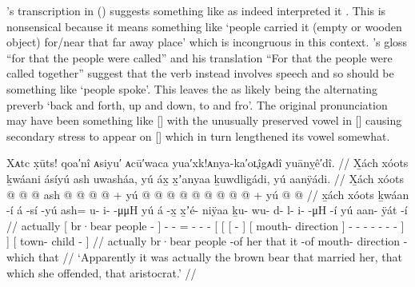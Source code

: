 \citeauthor{swanton:1909}’s transcription  in (\lastx) suggests something like  as indeed \citeauthor{leer:1977} interpreted it \parencite[2]{leer:1977}.
This is nonsensical because it means something like ‘people carried it (empty or wooden object) for/near that far away place’ which is incongruous in this context.
\citeauthor{swanton:1909}’s gloss “for that the people were called” and his translation “For that the people were called together” suggest that the verb instead involves speech and so should be something like  ‘people spoke’.
This leaves the  as likely being the alternating preverb  ‘back and forth, up and down, to and fro’.
The original pronunciation may have been something like [] with the unusually preserved vowel in [] causing secondary stress to appear on [] which in turn lengthened its vowel somewhat. 

\ex\label{ex:89-21-actually-brown-bear}%
%
\begingl
	\glpreamble	Xᴀtc x̣ūts! qoa′nî ᴀsiyu′ ᴀcū′waca yua′xk!ᴀnya-ka′oʟ̣îgᴀdî yuānỵê′dî. //
	\glpreamble	X̱ách xóots ḵwáani ásíyú ash uwasháa, yú áx̱ x̱ʼanyaa ḵuwdlig̱ádi, yú aanÿádi. //
	\gla	X̱ách
		{} xóots  @ {} {}
		 @ {} @ {}
		ash @  @ {} @ {} @ {} +
		{} yú {} {}  @ {} {}
			{}  @ {} {}
			 @ {} @ {} @ {} @ {} @ {} @ {} @ {} {} {} +
		{} yú  @ {} @ {} {} //
	\glb	x̱ách
		{} xóots ḵwáan -í {}
		á -sí -yú
		ash= u- i-  -μμH
		{} yú {} {} á -x̱ {}
			{} x̱ʼé- niÿaa {}
			ḵu- wu- d- l- i-  -μH -í {} {}
		{} yú aan- ÿát -í {} //
	\glc	actually
		{}[ br·bear people - {}]
		 - -
		= - -  -
		{}[  {}[ {}[  - {}]
			{}[ mouth- direction {}]
			- - - - -  - - {}] {}]
		{}[  town- child - {}] //
	\gld	actually
		{} br·bear people -of {}
		 {} {}
		her  {} {} {}
		{} that {} {} it -of {}
			{} mouth- direction {}
			 {} {} {} {} {} {} -which {} {}
		{} that  {} {} {} //
	\glft	‘Apparently it was actually the brown bear that married her, that which she offended, that aristocrat.’
		//
\endgl
\xe

